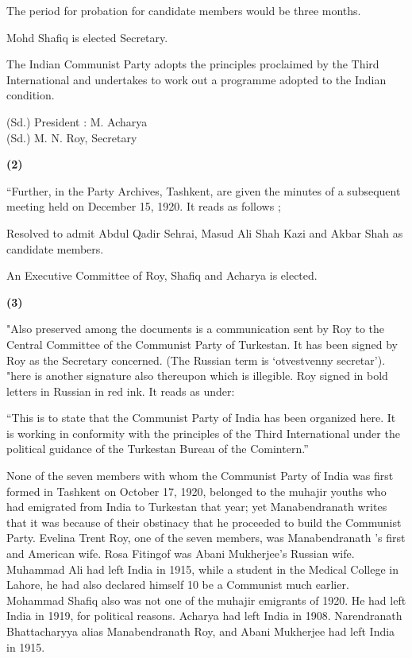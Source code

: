 The period for probation for candidate members would be three months. 

Mohd Shafiq is elected Secretary. 

The Indian Communist Party adopts the principles proclaimed 
by the Third International and undertakes to work out a 
programme adopted to the Indian condition. 

\indent (Sd.) President : M. Acharya \\
\indent (Sd.) M. N. Roy, Secretary 

\begin{center}
\textbf{(2)}    
\end{center}


“Further, in the Party Archives, Tashkent, are given the minutes of a subsequent meeting held on December 15, 1920. It reads as follows ; 

Resolved to admit Abdul Qadir Sehrai, Masud Ali Shah Kazi and Akbar Shah as candidate members. 

An Executive Committee of Roy, Shafiq and Acharya is elected. 

\begin{center}
\textbf{(3)}    
\end{center}


"Also preserved among the documents is a communication sent by Roy to the Central Committee of the Communist Party of Turkestan. It has been signed by Roy as the Secretary concerned. (The Russian term is ‘otvestvenny secretar’). "here is another signature also thereupon which is illegible. Roy signed in bold letters in Russian in red ink. It reads as under: 

“This is to state that the Communist Party of India has been organized here. It is working in conformity with the principles of the Third International under the political guidance of the Turkestan Bureau of the Comintern.” 

None of the seven members with whom the Communist Party of India was first formed in Tashkent on October 17, 1920, belonged to the muhajir youths who had emigrated from India to Turkestan that year; yet Manabendranath writes that it was because of their obstinacy that he proceeded to build the Communist Party. Evelina Trent Roy, one of the seven members, was Manabendranath ’s first and American wife. Rosa Fitingof was Abani Mukherjee’s Russian wife. Muhammad Ali had left India in 1915, while a student in the Medical College in Lahore, he had also declared himself 10 be a Communist much earlier. Mohammad Shafiq also was not one of the muhajir emigrants of 1920. He had left India in 1919, for political reasons. Acharya had left India in 1908. Narendranath Bhattacharyya alias Manabendranath Roy, and Abani Mukherjee had left India in 1915. 

